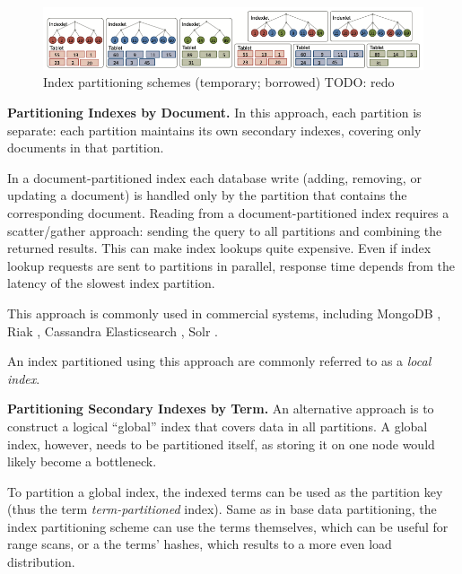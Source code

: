 \begin{figure}[t]
  \centering

  \includegraphics[width=\textwidth]{./figures/background/index_partitioning.png}

  \caption{Index partitioning schemes (temporary; borrowed)
  TODO: redo}

  \label{fig:index_partitioning}

\end{figure}

\bigskip
\noindent
\textbf{Partitioning Indexes by Document.}
In this approach, each partition is separate:
each partition maintains its own secondary indexes, covering only documents in that partition.

In a document-partitioned index
each database write (adding, removing, or updating a document) is handled only by the partition that contains the
corresponding document.
Reading from a document-partitioned index requires a scatter/gather approach:
sending the query to all partitions and combining the returned results.
This can make index lookups quite expensive.
Even if index lookup requests are sent to partitions in parallel, response time depends from the latency of the slowest
index partition.

This approach is commonly used in commercial systems, including
MongoDB \cite{coubase:mongoindexes}, Riak \cite{riakv:secondaryindexes}, Cassandra \cite{cassandra:secondaryindexing}
Elasticsearch \cite{elastic:docrouting}, Solr \cite{solr:indexsharding}.

An index partitioned using this approach are commonly referred to as a \textit{local index}.

\bigskip
\noindent
\textbf{Partitioning Secondary Indexes by Term.}
An alternative approach is to construct a logical ``global'' index that covers data in all partitions.
A global index, however, needs to be partitioned itself, as storing it on one node would likely become a bottleneck.

To partition a global index, the indexed terms can be used as the partition key (thus the term \textit{term-partitioned}
index).
Same as in base data partitioning, the index partitioning scheme can use the terms themselves, which can be useful for
range scans, or a the terms' hashes, which results to a more even load distribution.

